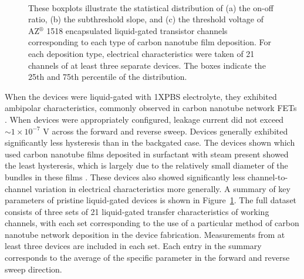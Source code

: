 \documentclass[
  a4paper,
]{scrbook}
\begin{document}
\begin{figure}
\begin{minipage}[t]{0.47\linewidth}
{{}

}

\subcaption{\label{fig-threshold-voltage}}
\end{minipage}%
%
\begin{minipage}[t]{0.26\linewidth}

{\centering 

~

}

\end{minipage}%

\caption{\label{fig-sweep-parameters}These boxplots illustrate the
statistical distribution of (a) the on-off ratio, (b) the subthreshold
slope, and (c) the threshold voltage of AZ\(^\circledR\) 1518
encapsulated liquid-gated transistor channels corresponding to each type
of carbon nanotube film deposition. For each deposition type, electrical
characteristics were taken of 21 channels of at least three separate
devices. The boxes indicate the 25th and 75th percentile of the
distribution.}

\end{figure}

When the devices were liquid-gated with 1XPBS electrolyte, they
exhibited ambipolar characteristics, commonly observed in carbon
nanotube network FETs
\autocite{Kauffman2008,Heller2009,JongYu2009,Derenskyi2014,Thanihaichelvan2018,Albarghouthi2022}.
When devices were appropriately configured, leakage current did not
exceed \(\sim 1 \times 10^{-7}\) V across the forward and reverse sweep.
Devices generally exhibited significantly less hysteresis than in the
backgated case. The devices shown which used carbon nanotube films
deposited in surfactant with steam present showed the least hysteresis,
which is largely due to the relatively small diameter of the bundles in
these films \autocite{Pop2009}. These devices also showed significantly
less channel-to-channel variation in electrical characteristics more
generally. A summary of key parameters of pristine liquid-gated devices
is shown in Figure~\ref{fig-sweep-parameters}. The full dataset consists
of three sets of 21 liquid-gated transfer characteristics of working
channels, with each set corresponding to the use of a particular method
of carbon nanotube network deposition in the device fabrication.
Measurements from at least three devices are included in each set. Each
entry in the summary corresponds to the average of the specific
parameter in the forward and reverse sweep direction.
\end{document}
